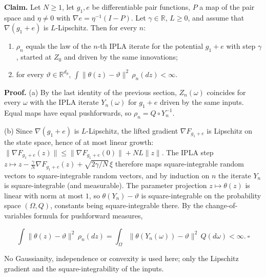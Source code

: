 \documentclass[11pt,a4paper]{report}
\begin{document}
\textbf{Claim.} Let \(N\ge1\), let \(g_1,e\) be differentiable pair functions, \(P\) a map of the pair space and \(\eta\ne0\) with \(\nabla e=\eta^{-1}(I-P)\). Let \(\gamma\in\mathbb R\), \(L\ge0\), and assume that \(\nabla(g_1+e)\) is \(L\)-Lipschitz. Then for every \(n\):



\begin{enumerate}


\item \(\rho_n\) equals the law of the \(n\)-th IPLA iterate for the potential \(g_1+e\) with step \(\gamma\), started at \(Z_0\) and driven by the same innovations;

\item for every \(\vartheta\in\mathbb R^{d_\theta}\), \(\int\|\theta(z)-\vartheta\|^2\,\rho_n(dz)<\infty\).

\end{enumerate}



\textbf{Proof.} (a) By the last identity of the previous section, \(Z_n(\omega)\) coincides for every \(\omega\) with the IPLA iterate \(Y_n(\omega)\) for \(g_1+e\) driven by the same inputs. Equal maps have equal pushforwards, so \(\rho_n=Q\circ Y_n^{-1}\).




(b) Since \(\nabla(g_1+e)\) is \(L\)-Lipschitz, the lifted gradient \(\nabla F_{g_1+e}\) is Lipschitz on the state space, hence of at most linear growth: \(\|\nabla F_{g_1+e}(z)\|\le\|\nabla F_{g_1+e}(0)\|+NL\|z\|\). The IPLA step \(z\mapsto z-\frac\gamma N\nabla F_{g_1+e}(z)+\sqrt{2\gamma/N}\,\xi\) therefore maps square-integrable random vectors to square-integrable random vectors, and by induction on \(n\) the iterate \(Y_n\) is square-integrable (and measurable). The parameter projection \(z\mapsto\theta(z)\) is linear with norm at most \(1\), so \(\theta(Y_n)-\vartheta\) is square-integrable on the probability space \((\Omega,Q)\), constants being square-integrable there. By the change-of-variables formula for pushforward measures,


\[\int\|\theta(z)-\vartheta\|^2\,\rho_n(dz)=\int_\Omega\|\theta(Y_n(\omega))-\vartheta\|^2\,Q(d\omega)<\infty .\ \square\]


No Gaussianity, independence or convexity is used here; only the Lipschitz gradient and the square-integrability of the inputs.
\end{document}
